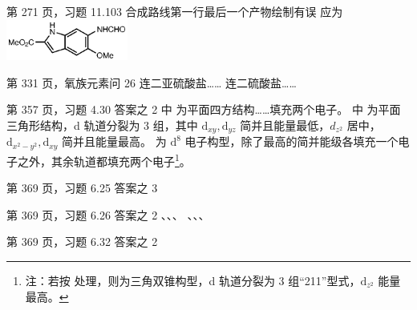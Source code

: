 \documentclass{errata}
\begin{document}
\begin{Errata}
        \item[第 271 页，习题 11.103] \Orig 合成路线第一行最后一个产物绘制有误 \Corr 应为 \includegraphics[width=0.3\textwidth]{img/11.103.eps}
        \item[第 331 页，氧族元素问 26] \Orig 连二亚硫酸盐…… \Corr 连二硫酸盐…… 
        \item[第 357 页，习题 4.30 答案之 2]
            \Orig {} 中  为平面四方结构……填充两个电子。
            \Corr {} 中  为平面三角形结构，d 轨道分裂为 3 组，其中 $\mathrm d_{xy}, \mathrm d_{yz}$ 简并且能量最低，$d_{z^2}$ 居中，$\mathrm d_{x^2-y^2}, \mathrm d_{xy}$ 简并且能量最高。 为 $\mathrm d^8$ 电子构型，除了最高的简并能级各填充一个电子之外，其余轨道都填充两个电子\footnote{注：若按  处理，则为三角双锥构型，d 轨道分裂为 3 组“211”型式，$\mathrm d_{z^2}$ 能量最高。}。
        \item[第 369 页，习题 6.25 答案之 3]
            \Orig {}
            \Corr  {}
        \item[第 369 页，习题 6.26 答案之 2]
            \Orig {}、、、
            \Corr {}、、、
        \item[第 369 页，习题 6.32 答案之 2]
            \Orig {}
            \Corr {}
    \end{Errata}

    \renewcommand{\em}{\itshape}
    \renewcommand*{\bibfont}{\footnotesize}
    \renewcommand{\refname}{参考文献}
    \renewcommand{\bibname}{参考文献}
    \printbibliography
\end{document}
